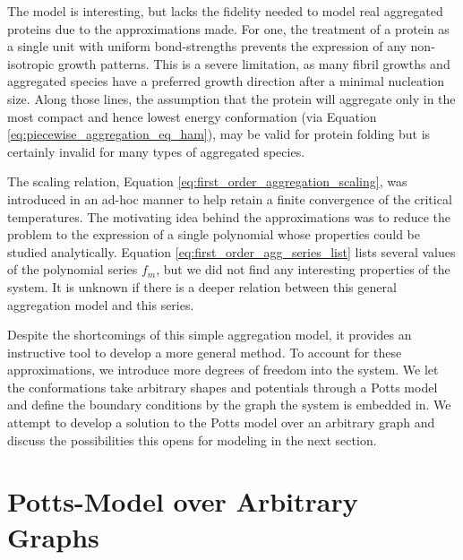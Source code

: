 The model is interesting, but lacks the fidelity needed to model real aggregated proteins due to the approximations made. For one, the treatment of a protein as a single unit with uniform bond-strengths prevents the expression of any non-isotropic growth patterns. This is a severe limitation, as many fibril growths and aggregated species have a preferred growth direction after a minimal nucleation size. Along those lines, the assumption that the protein will aggregate only in the most compact and hence lowest energy conformation (via Equation \ref{eq:piecewise_aggregation_eq_ham}), may be valid for protein folding but is certainly invalid for many types of aggregated species. 

The scaling relation, Equation \ref{eq:first_order_aggregation_scaling}, was introduced in an ad-hoc manner to help retain a finite convergence of the critical temperatures. The motivating idea behind the approximations was to reduce the problem to the expression of a single polynomial whose properties could be studied analytically. Equation \ref{eq:first_order_agg_series_list} lists several values of the polynomial series $f_m$, but we did not find any interesting properties of the system. It is unknown if there is a deeper relation between this general aggregation model and this series.

Despite the shortcomings of this simple aggregation model, it provides an instructive tool to develop a more general method. To account for these approximations, we introduce more degrees of freedom into the system. We let the conformations take arbitrary shapes and potentials through a Potts model and define the boundary conditions by the graph the system is embedded in. We attempt to develop a solution to the Potts model over an arbitrary graph and discuss the possibilities this opens for modeling in the next section.


\section{Potts-Model over Arbitrary Graphs}
\label{sec:potts_over_arbit_graphs}

